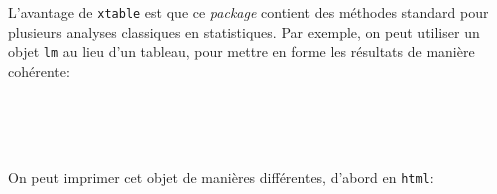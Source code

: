 L'avantage de \texttt{xtable} est que ce \emph{package} contient des méthodes standard pour plusieurs analyses classiques en statistiques. Par exemple, on peut utiliser un objet \texttt{lm} au lieu d'un tableau, pour mettre en forme les résultats de manière cohérente:

\begin{knitrout}
\color{fgcolor}\begin{kframe}
\begin{flushleft}
\ttfamily\noindent
{}\hlassignement{\usebox{\hlnormalsizeboxlessthan}-}{\ }\hlkeyword{(}\hlkeyword{:}\hlkeyword{)}\hspace*{\fill}\\
\hlstd{}\hlassignement{\usebox{\hlnormalsizeboxlessthan}-}{\ }\hlkeyword{*}{\ }\hlkeyword{+}{\ }\hlkeyword{+}{\ }\hlkeyword{(}\hlkeyword{(}\hlkeyword{)}\hlkeyword{)}\hspace*{\fill}\\
\hlstd{}\hlassignement{\usebox{\hlnormalsizeboxlessthan}-}{\ }\hlkeyword{(}\hlkeyword{\urltilda{}}{\ }\hlkeyword{)}\hspace*{\fill}\\
\hlstd{}\hlassignement{\usebox{\hlnormalsizeboxlessthan}-}{\ }\hlkeyword{(}\hlkeyword{)}\mbox{}
\normalfont
\end{flushleft}
\end{kframe}
\end{knitrout}


On peut imprimer cet objet de manières différentes, d'abord en \texttt{html}:

